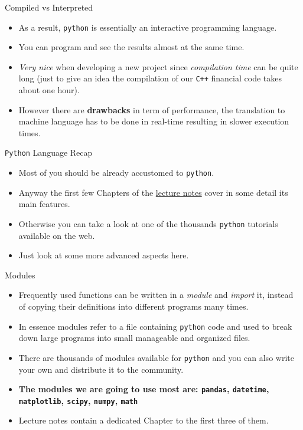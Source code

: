 \documentclass{beamer}
\begin{document}
\begin{frame}{Compiled vs Interpreted}
  \begin{itemize}
  \item As a result, \texttt{python} is essentially an interactive programming language.
  \item You can program and see the results almost at the same time. 
  \item \emph{Very nice} when developing a new project since \emph{compilation time} can be quite long (just to give an idea the compilation of our \texttt{C++} financial code takes about one hour). 
  \item However there are \textbf{drawbacks} in term of performance, the translation to machine language has to be done in real-time resulting in slower execution times.
  \end{itemize}
\end{frame}

\begin{frame}{\texttt{Python} Language Recap}
  \begin{itemize}
    \item Most of you should be already accustomed to \texttt{python}.
    \item Anyway the first few Chapters of the \href{https://drive.google.com/file/d/1fuVzryJwMCilgynwS7VbWKAmKQBojMQs/view?usp=sharing}{lecture notes} cover in some detail its main features.
    \item Otherwise you can take a look at one of the thousands \texttt{python} tutorials available on the web.
    \item Just look at some more advanced aspects here.
  \end{itemize}
\end{frame}

\begin{frame}[fragile]{Modules}
  \begin{itemize}
  \item Frequently used functions can be written in a \emph{module} and \emph{import} it, instead of copying their definitions into different programs many times.
  \item In essence modules refer to a file containing \texttt{python} code and used to break down large programs into small manageable and organized files. 
  \item There are thousands of modules available for \texttt{python} and you can also write your own and distribute it to the community.
  \item \textbf{The modules we are going to use most are: \texttt{pandas}, \texttt{datetime}, \texttt{matplotlib}, \texttt{scipy}, \texttt{numpy}, \texttt{math}}
  \item  Lecture notes contain a dedicated Chapter to the first three of them.
  \end{itemize}
\end{frame}
\end{document}
